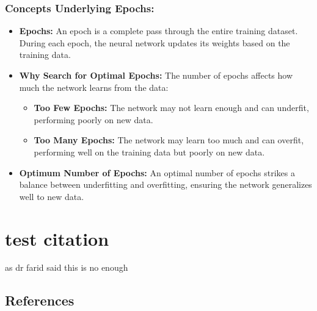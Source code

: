 \documentclass[
  super,
  review,
  3p]{elsarticle}
\providecommand{\tightlist}{%
  \setlength{\itemsep}{0pt}\setlength{\parskip}{0pt}}\usepackage{longtable,booktabs,array}
\begin{document}
\subsubsection{Concepts Underlying
Epochs:}\label{concepts-underlying-epochs}

\begin{itemize}
\tightlist
\item
  \textbf{Epochs:} An epoch is a complete pass through the entire
  training dataset. During each epoch, the neural network updates its
  weights based on the training data.
\item
  \textbf{Why Search for Optimal Epochs:} The number of epochs affects
  how much the network learns from the data:

  \begin{itemize}
  \tightlist
  \item
    \textbf{Too Few Epochs:} The network may not learn enough and can
    underfit, performing poorly on new data.
  \item
    \textbf{Too Many Epochs:} The network may learn too much and can
    overfit, performing well on the training data but poorly on new
    data.
  \end{itemize}
\item
  \textbf{Optimum Number of Epochs:} An optimal number of epochs strikes
  a balance between underfitting and overfitting, ensuring the network
  generalizes well to new data.
\end{itemize}

\section{test citation}\label{test-citation}

as dr farid said \citep{Dirac1953888} this is no enough

\subsection*{References}\label{references}

\renewcommand{\bibsection}{}





\nocite{*}
\end{document}
